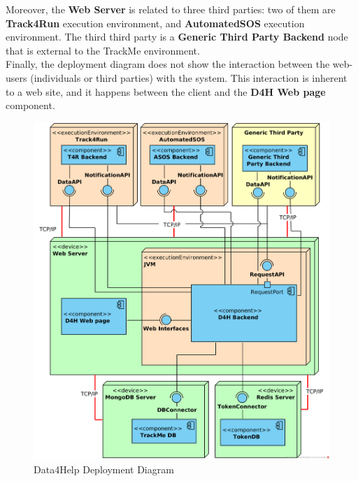 \documentclass[a4paper, hidelinks, 12pt]{report}
\begin{document}
	Moreover, the \textbf{Web Server} is related to three third parties: two of them are \textbf{Track4Run} execution environment, and \textbf{AutomatedSOS} execution environment. The third third party is a \textbf{Generic Third Party Backend} node that is external to the TrackMe environment.\\
	
	Finally, the deployment diagram does not show the interaction between the web-users (individuals or third parties) with the system. This interaction is inherent to a web site, and it happens between the client and the \textbf{D4H Web page} component.
		\begin{figure}[H]
			\centering
			\includegraphics[width=1\textwidth]{diagrams/d4h_deployment_diagram.png}
			\caption[Data4Help Deployment Diagram]{Data4Help Deployment Diagram}
			\label{fig:d4h_deployment_diagram}
		\end{figure}	
		
\end{document}
